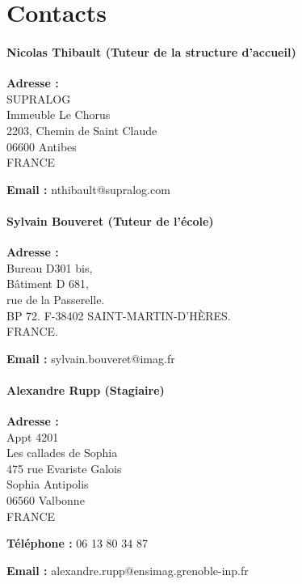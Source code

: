 \newpage
\section*{Contacts}

\paragraph{Nicolas Thibault (Tuteur de la structure d'accueil)}

\begin{sitemize}
\item \textbf{Adresse :}  \\

SUPRALOG \\
Immeuble Le Chorus\\
2203, Chemin de Saint Claude\\
06600 Antibes \\
FRANCE \\

\item \textbf{Email :} nthibault@supralog.com
\end{sitemize}

\paragraph{Sylvain Bouveret (Tuteur de l'école)}

\begin{sitemize}
\item \textbf{Adresse :}  \\

Bureau D301 bis, \\
Bâtiment D 681, \\
rue de la Passerelle. \\
BP 72. F-38402 SAINT-MARTIN-D'HÈRES. \\
FRANCE.\\

\item \textbf{Email :} sylvain.bouveret@imag.fr
\end{sitemize}

\paragraph{Alexandre Rupp (Stagiaire)}
\begin{sitemize}
\item \textbf{Adresse :}  \\

Appt 4201 \\
Les callades de Sophia \\
475 rue Evariste Galois \\
Sophia Antipolis \\
06560 Valbonne \\
FRANCE\\

\item \textbf{Téléphone :} 06 13 80 34 87

\item \textbf{Email :} alexandre.rupp@ensimag.grenoble-inp.fr
\end{sitemize}